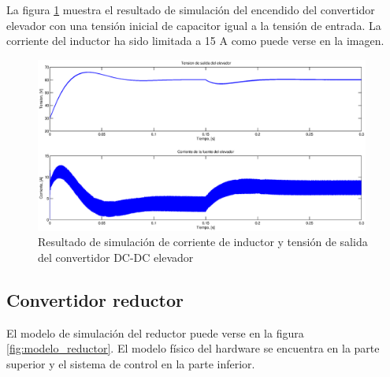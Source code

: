 La figura \ref{fig:curvas_elevador} muestra el resultado de simulación del encendido del convertidor elevador con una tensión inicial de
capacitor igual a la tensión de entrada. La corriente del inductor ha sido limitada a 15 A como puede verse en la imagen.

\begin{figure}[H]
  \centering
  \includegraphics[width=11cm]{gfx/curvas_elevador.eps}
  \caption{Resultado de simulación de corriente de inductor y tensión de salida del convertidor DC-DC elevador}
  \label{fig:curvas_elevador}
\end{figure}

\subsection{Convertidor reductor}
El modelo de simulación del reductor puede verse en la figura \ref{fig:modelo_reductor}. El modelo físico del hardware se encuentra en la parte
superior y el sistema de control en la parte inferior.

